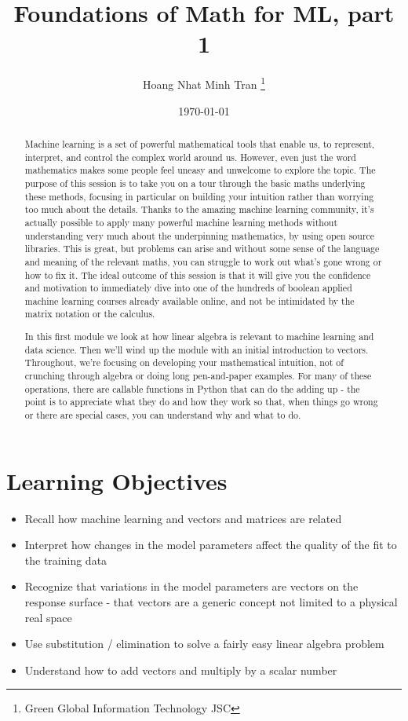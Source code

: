 \documentclass[]{article}
\title{Foundations of Math for ML, part 1}
\author{Hoang Nhat Minh Tran \thanks{Green Global Information Technology JSC}}
\date{\today}
\begin{document}
\maketitle

\begin{abstract}
Machine learning is a set of powerful mathematical tools that enable us, to represent, interpret, and control the complex world around us.
However, even just the word mathematics makes some people feel uneasy and unwelcome to explore the topic.
The purpose of this session is to take you on a tour through the basic maths underlying these methods, focusing in particular on building your intuition rather than worrying too much about the details.
Thanks to the amazing machine learning community, it's actually possible to apply many powerful machine learning methods without understanding very much about the underpinning mathematics, by using open source libraries.
This is great, but problems can arise and without some sense of the language and meaning of the relevant maths, you can struggle to work out what's gone wrong or how to fix it.
The ideal outcome of this session is that it will give you the confidence and motivation to immediately dive into one of the hundreds of boolean applied machine learning courses already available online, and not be intimidated by the matrix notation or the calculus.

In this first module we look at how linear algebra is relevant to machine learning and data science. Then we'll wind up the module with an initial introduction to vectors. Throughout, we're focusing on developing your mathematical intuition, not of crunching through algebra or doing long pen-and-paper examples. For many of these operations, there are callable functions in Python that can do the adding up - the point is to appreciate what they do and how they work so that, when things go wrong or there are special cases, you can understand why and what to do.

\end{abstract}

\section{Learning Objectives}

\begin{itemize}
	\item Recall how machine learning and vectors and matrices are related
	\item Interpret how changes in the model parameters affect the quality of the fit to the training data
	\item Recognize that variations in the model parameters are vectors on the response surface - that vectors are a generic concept not limited to a physical real space
	\item Use substitution / elimination to solve a fairly easy linear algebra problem
	\item Understand how to add vectors and multiply by a scalar number
\end{itemize}
\end{document}
